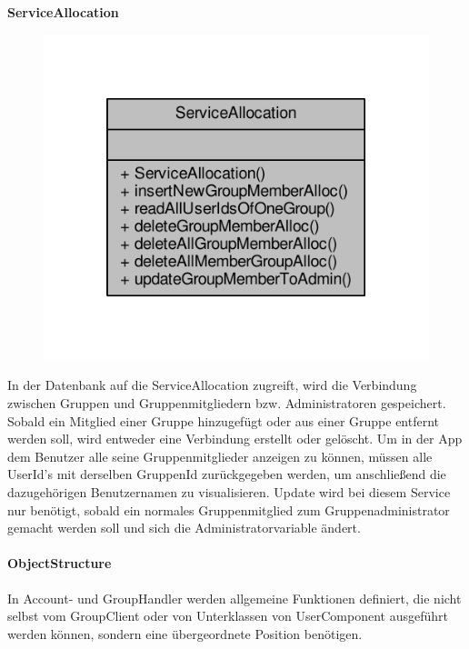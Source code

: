 \textbf{ServiceAllocation}
\begin{figure}[H]
	\includegraphics[scale = 1]{res/umlClasses/service_allocation__coll__graph.pdf} 
	\centering
\end{figure}
In der Datenbank auf die ServiceAllocation zugreift, wird die Verbindung zwischen Gruppen und Gruppenmitgliedern bzw. Administratoren gespeichert. 
Sobald ein Mitglied einer Gruppe hinzugefügt oder aus einer Gruppe entfernt werden soll, wird entweder eine Verbindung erstellt oder gelöscht. 
Um in der App dem Benutzer alle seine Gruppenmitglieder anzeigen zu können, müssen alle UserId's mit derselben GruppenId zurückgegeben werden, um anschließend die dazugehörigen Benutzernamen zu visualisieren.
Update wird bei diesem Service nur benötigt, sobald ein normales Gruppenmitglied zum Gruppenadministrator gemacht werden soll und sich die Administratorvariable ändert.
	

\paragraph{ObjectStructure}

In Account- und GroupHandler werden allgemeine Funktionen definiert, die nicht selbst vom GroupClient oder von Unterklassen von UserComponent ausgeführt werden können, sondern eine übergeordnete Position benötigen.

